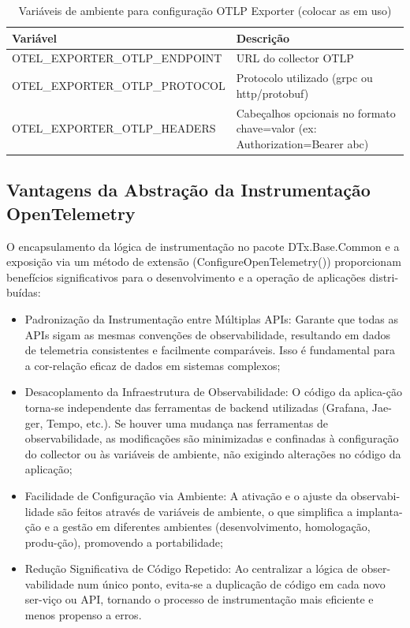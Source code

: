 \begin{table}[H]
\centering
\caption{Variáveis de ambiente para configuração OTLP Exporter (colocar as em uso)}
\label{tab:otlp_exporter_env_vars}
\begin{tabular}{|p{6cm}|p{8cm}|}
\hline
\textbf{Variável} & \textbf{Descrição} \\
\hline
OTEL\_EXPORTER\_OTLP\_ENDPOINT & URL do collector OTLP \\
\hline
OTEL\_EXPORTER\_OTLP\_PROTOCOL & Protocolo utilizado (grpc ou http/protobuf) \\
\hline
OTEL\_EXPORTER\_OTLP\_HEADERS & Cabeçalhos opcionais no formato chave=valor (ex: Authorization=Bearer abc) \\
\hline
\end{tabular}
\end{table}


\subsection{Vantagens da Abstração da Instrumentação OpenTelemetry}

O encapsulamento da lógica de instrumentação no pacote DTx.Base.Common e a exposição via um método de extensão (ConfigureOpenTelemetry()) proporcionam benefícios significativos para o desenvolvimento e a operação de aplicações distri-buídas:

\begin{itemize}
    \item Padronização da Instrumentação entre Múltiplas APIs: Garante que todas as APIs sigam as mesmas convenções de observabilidade, resultando em dados de telemetria consistentes e facilmente comparáveis. Isso é fundamental para a cor-relação eficaz de dados em sistemas complexos;
    \item Desacoplamento da Infraestrutura de Observabilidade: O código da aplica-ção torna-se independente das ferramentas de backend utilizadas (Grafana, Jae-ger, Tempo, etc.). Se houver uma mudança nas ferramentas de observabilidade, as modificações são minimizadas e confinadas à configuração do collector ou às variáveis de ambiente, não exigindo alterações no código da aplicação;
    \item Facilidade de Configuração via Ambiente: A ativação e o ajuste da observabi-lidade são feitos através de variáveis de ambiente, o que simplifica a implanta-ção e a gestão em diferentes ambientes (desenvolvimento, homologação, produ-ção), promovendo a portabilidade;
    \item Redução Significativa de Código Repetido: Ao centralizar a lógica de obser-vabilidade num único ponto, evita-se a duplicação de código em cada novo ser-viço ou API, tornando o processo de instrumentação mais eficiente e menos propenso a erros.
\end{itemize}

